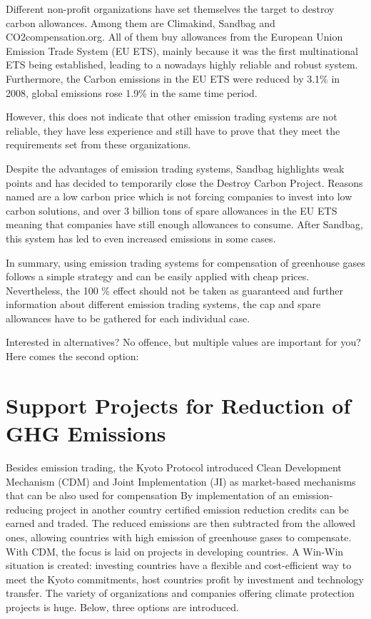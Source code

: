 Different non-profit organizations have set themselves the target to destroy carbon allowances. Among them are Climakind, Sandbag and CO2compensation.org. 
All of them buy allowances from the European Union Emission Trade System (EU ETS), mainly because it was the first multinational ETS being established, leading to a nowadays highly reliable and robust system. Furthermore, the Carbon emissions in the EU ETS were reduced by 3.1\% in 2008, global emissions rose 1.9\% in the same time period. 
\cite{climakind_2} %

However, this does not indicate that other emission trading systems are not reliable, they have less experience and still have to prove that they meet the requirements set from these organizations. 

Despite the advantages of emission trading systems, Sandbag highlights weak points and has decided to temporarily close the Destroy Carbon Project. Reasons named are a low carbon price which is not forcing companies to invest into low carbon solutions, and over 3 billion tons of spare allowances in the EU ETS meaning that companies have still enough allowances to consume. After Sandbag, this system has led to even increased emissions in some cases. \cite{sandbag}


In summary, using emission trading systems for compensation of greenhouse gases follows a simple strategy and can be easily applied with cheap prices. Nevertheless, the 100 \% effect should not be taken as guaranteed and further information about different emission trading systems, the cap and spare allowances have to be gathered for each individual case. 


Interested in alternatives? No offence, but multiple values are important for you? Here comes the second option:

\section{Support Projects for Reduction of GHG Emissions}	

Besides emission trading, the Kyoto Protocol introduced Clean Development Mechanism (CDM) and Joint Implementation (JI) as market-based mechanisms that can be also used for compensation \cite{unfccc} %
By implementation of an emission-reducing project in another country certified emission reduction credits can be earned and traded. The reduced emissions are then subtracted from the allowed ones, allowing countries with high emission of greenhouse gases to compensate. With CDM, the focus is laid on projects in developing countries. A Win-Win situation is created: investing countries have a flexible and cost-efficient way to meet the Kyoto commitments, host countries profit by investment and technology transfer.
The variety of organizations and companies offering climate protection projects is huge. Below, three options are introduced.

